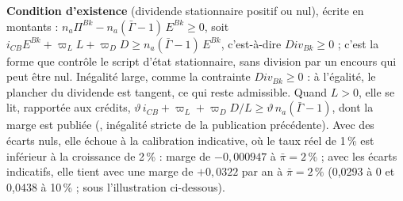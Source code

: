 \documentclass[11pt,a4paper]{article}
\newcommand{\barre}[1]{\leavevmode\sbox{\boitebarre}{#1}\rlap{\rule[0.6ex]{\wd\boitebarre}{0.4pt}}\usebox{\boitebarre}}
\begin{document}
\begin{proposee}
\textbf{Condition d'existence} (dividende stationnaire positif ou nul), écrite en montants : $n_a\Pi^{\mathit{Bk}} - n_a(\bar\Gamma - 1)\,E^{\mathit{Bk}} \ge 0$, soit $i_{\mathit{CB}} E^{\mathit{Bk}} + \varpi_L L + \varpi_D D \ge n_a(\bar\Gamma - 1)\,E^{\mathit{Bk}}$, c'est-à-dire $\mathit{Div}_{\mathit{Bk}} \ge 0$ ; c'est la forme que contrôle le script d'état stationnaire, sans division par un encours qui peut être nul. Inégalité large, comme la contrainte $\mathit{Div}_{\mathit{Bk}} \ge 0$ : à l'égalité, le plancher du dividende est tangent, ce qui reste admissible. Quand $L > 0$, elle se lit, rapportée aux crédits, $\vartheta\, i_{\mathit{CB}} + \varpi_L + \varpi_D D/L \ge \vartheta\, n_a(\bar\Gamma - 1)$, dont la marge est publiée (\barre{$>$}, inégalité stricte de la publication précédente). Avec des écarts nuls, elle échoue à la calibration indicative, où le taux réel de 1\,\% est inférieur à la croissance de 2\,\% : marge de $-0{,}000947$ à $\bar\pi = 2\,\%$ ; avec les écarts indicatifs, elle tient avec une marge de $+0{,}0322$ par an à $\bar\pi = 2\,\%$ (0,0293 à 0 et 0,0438 à 10\,\% ; \barre{$+0{,}0330$} sous l'illustration ci-dessous).


\end{proposee}
\end{document}
